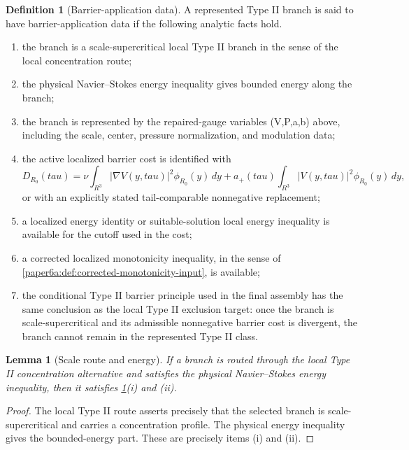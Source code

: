 \documentclass[11pt]{amsart}
\def\({}%
\def\){}%
\def\tilde#1{#1}%
\def\mathfrak#1{#1}%
\def\mathbb#1{#1}%
\def\tau{tau}%
\theoremstyle{plain}
\newtheorem{lemma}[theorem]{Lemma}
\theoremstyle{definition}
\newtheorem{definition}[theorem]{Definition}
\theoremstyle{remark}
\begin{document}
\begin{definition}[Barrier-application data]\label{paper6a:def:barrier-application-data}
A represented Type II branch is said to have barrier-application data if the
following analytic facts hold.
\begin{enumerate}[label=\textup{(\roman*)}]
\item the branch is a scale-supercritical local Type II branch in the sense of
the local concentration route;
\item the physical Navier--Stokes energy inequality gives bounded energy along
the branch;
\item the branch is represented by the repaired-gauge variables
\((V,P,a,b)\) above, including the scale, center, pressure normalization, and
modulation data;
\item the active localized barrier cost is identified with
\[
  \tilde{\mathfrak D}_{R_0}(\tau)
  =
  \nu\int_{\mathbb R^3}|\nabla V(y,\tau)|^2\phi_{R_0}(y)\,dy
  +a_+(\tau)\int_{\mathbb R^3}|V(y,\tau)|^2\phi_{R_0}(y)\,dy,
\]
or with an explicitly stated tail-comparable nonnegative replacement;
\item a localized energy identity or suitable-solution local energy inequality
is available for the cutoff used in the cost;
\item a corrected localized monotonicity inequality, in the sense of
\cref{paper6a:def:corrected-monotonicity-input}, is available;
\item the conditional Type II barrier principle used in the final assembly has
the same conclusion as the local Type II exclusion target: once the branch is
scale-supercritical and its admissible nonnegative barrier cost is divergent,
the branch cannot remain in the represented Type II class.
\end{enumerate}
\end{definition}

\begin{lemma}[Scale route and energy]\label{paper6a:lem:scale-energy-data}
If a branch is routed through the local Type II concentration alternative and
satisfies the physical Navier--Stokes energy inequality, then it satisfies
\cref{paper6a:def:barrier-application-data}\textup{(i)} and
\textup{(ii)}.
\end{lemma}

\begin{proof}
The local Type II route asserts precisely that the selected branch is
scale-supercritical and carries a concentration profile.  The physical energy
inequality gives the bounded-energy part.  These are precisely items
\textup{(i)} and \textup{(ii)}.
\end{proof}
\end{document}
